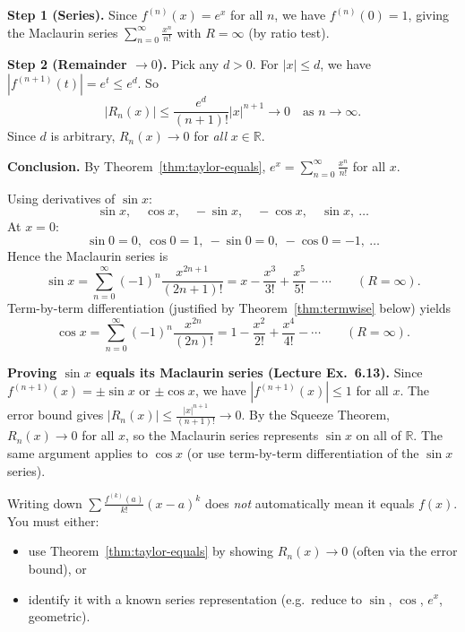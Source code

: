 \begin{examplebox}[title={Worked Example: proving $e^x$ equals its Maclaurin series (Lecture Ex.~6.12)}]
\textbf{Step 1 (Series).} Since $f^{(n)}(x)=e^x$ for all $n$, we have $f^{(n)}(0)=1$, giving the Maclaurin series
$\sum_{n=0}^{\infty}\frac{x^n}{n!}$ with $R=\infty$ (by ratio test).

\smallskip
\textbf{Step 2 (Remainder $\to 0$).}
Pick any $d>0$. For $|x|\le d$, we have $|f^{(n+1)}(t)|=e^t\le e^d$. So
\[
|R_n(x)|\le \frac{e^d}{(n+1)!}|x|^{n+1}\to 0
\quad\text{as }n\to\infty.
\]
Since $d$ is arbitrary, $R_n(x)\to 0$ for \emph{all} $x\in\mathbb{R}$.

\smallskip
\textbf{Conclusion.} By Theorem~\ref{thm:taylor-equals},
$e^x=\sum_{n=0}^{\infty}\frac{x^n}{n!}$ for all $x$.
\end{examplebox}

\begin{examplebox}[title={Worked Example: Maclaurin series for $\sin x$ and $\cos x$}]
Using derivatives of $\sin x$:
\[
\sin x,\quad \cos x,\quad -\sin x,\quad -\cos x,\quad \sin x,\ \dots
\]
At $x=0$:
\[
\sin 0=0,\ \cos 0=1,\ -\sin 0=0,\ -\cos 0=-1,\ \dots
\]
Hence the Maclaurin series is
\[
\sin x=\sum_{n=0}^{\infty}(-1)^n\frac{x^{2n+1}}{(2n+1)!}
= x-\frac{x^3}{3!}+\frac{x^5}{5!}-\cdots \qquad (R=\infty).
\]
Term-by-term differentiation (justified by Theorem~\ref{thm:termwise} below) yields
\[
\cos x=\sum_{n=0}^{\infty}(-1)^n\frac{x^{2n}}{(2n)!}
=1-\frac{x^2}{2!}+\frac{x^4}{4!}-\cdots \qquad (R=\infty).
\]
\end{examplebox}

\noindent\textbf{Proving $\sin x$ equals its Maclaurin series (Lecture Ex.~6.13).}
Since $f^{(n+1)}(x)=\pm\sin x$ or $\pm\cos x$, we have $|f^{(n+1)}(x)|\le 1$ for all $x$.
The error bound gives $|R_n(x)|\le \frac{|x|^{n+1}}{(n+1)!}\to 0$.
By the Squeeze Theorem, $R_n(x)\to 0$ for all $x$, so the Maclaurin series represents $\sin x$ on all of $\mathbb{R}$.
The same argument applies to $\cos x$ (or use term-by-term differentiation of the $\sin x$ series).

\begin{commonmistake}[title={Common Mistake: ``Taylor series exists'' vs ``Taylor series equals $f$''}]
Writing down $\sum \frac{f^{(k)}(a)}{k!}(x-a)^k$ does \emph{not} automatically mean it equals $f(x)$.
You must either:
\begin{itemize}[leftmargin=*]
\item use Theorem~\ref{thm:taylor-equals} by showing $R_n(x)\to 0$ (often via the error bound), or
\item identify it with a known series representation (e.g.\ reduce to $\sin$, $\cos$, $e^x$, geometric).
\end{itemize}
\end{commonmistake}

